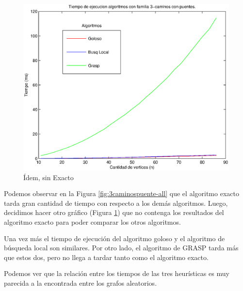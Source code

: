 \begin{figure}[H]
\begin{minipage}{0.5\linewidth}
      \includegraphics[width=\linewidth]{graficos/todos_tiempo_puentes_sinE.eps}
      \caption{Ídem, sin Exacto}\label{fig:3caminospuente-sinE}
    \end{minipage}    
\end{figure}

Podemos observar en la Figura \ref{fig:3caminospuente-all} que el algoritmo exacto tarda gran cantidad de tiempo con respecto a los demás algoritmos. Luego, decidimos hacer otro gráfico (Figura \ref{fig:3caminospuente-sinE}) que no contenga los resultados del algoritmo exacto para poder comparar los otros algoritmos.

Una vez más el tiempo de ejecución del algoritmo goloso y el algoritmo de búsqueda local son similares. Por otro lado, el algoritmo de GRASP tarda más que estos dos, pero no llega a tardar tanto como el algoritmo exacto.

Podemos ver que la relación entre los tiempos de las tres heurísticas es muy parecida a la encontrada entre los grafos aleatorios. 